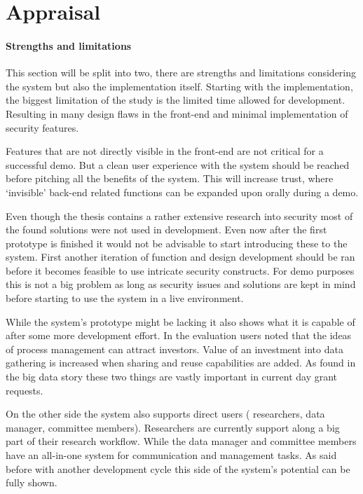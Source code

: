 \section{Appraisal}

\paragraph{Strengths and limitations}
This section will be split into two, there are strengths and limitations considering the system but also the implementation itself.
Starting with the implementation, the biggest limitation of the study is the limited time allowed for development.
Resulting in many design flaws in the front-end and minimal implementation of security features.

Features that are not directly visible in the front-end are not critical for a successful demo.
But a clean user experience with the system should be reached before pitching all the benefits of the system.
This will increase trust, where `invisible' back-end related functions can be expanded upon orally during a demo.

Even though the thesis contains a rather extensive research into security most of the found solutions were not used in development.
Even now after the first prototype is finished it would not be advisable to start introducing these to the system.
First another iteration of function and design development should be ran before it becomes feasible to use intricate security constructs.
For demo purposes this is not a big problem as long as security issues and solutions are kept in mind before starting to use the system in a live environment.

While the system's prototype might be lacking it also shows what it is capable of after some more development effort.
In the evaluation users noted that the ideas of process management can attract investors.
Value of an investment into data gathering is increased when sharing and reuse capabilities are added.
As found in the big data story these two things are vastly important in current day grant requests.

On the other side the system also supports direct users (\ie{} researchers, data manager, committee members).
Researchers are currently support along a big part of their research workflow.
While the data manager and committee members have an all-in-one system for communication and management tasks.
As said before with another development cycle this side of the system's potential can be fully shown.

